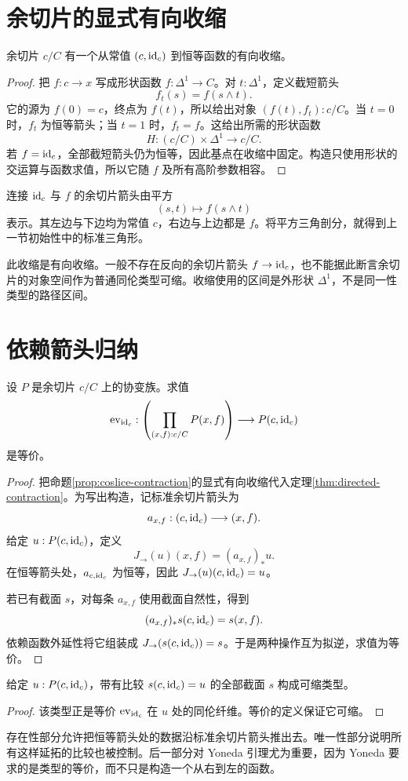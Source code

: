 \section{余切片的显式有向收缩}
\begin{proposition}[基于恒等箭头的收缩]\label{prop:coslice-contraction}
余切片 $c/C$ 有一个从常值 $(c,\operatorname{id}_c)$ 到恒等函数的有向收缩。
\end{proposition}
\begin{proof}
把 $f:c\to x$ 写成形状函数 $f:\Delta^1\to C$。对 $t:\Delta^1$，定义截短箭头
\[
f_t(s)=f(s\wedge t).
\]
它的源为 $f(0)=c$，终点为 $f(t)$，所以给出对象 $(f(t),f_t):c/C$。当 $t=0$ 时，$f_t$ 为恒等箭头；当 $t=1$ 时，$f_t=f$。这给出所需的形状函数
\[
H:(c/C)\times\Delta^1\longrightarrow c/C.
\]
若 $f=\operatorname{id}_c$，全部截短箭头仍为恒等，因此基点在收缩中固定。构造只使用形状的交运算与函数求值，所以它随 $f$ 及所有高阶参数相容。
\end{proof}
\begin{example}[收缩的平方]
连接 $\operatorname{id}_c$ 与 $f$ 的余切片箭头由平方
\[
(s,t)\longmapsto f(s\wedge t)
\]
表示。其左边与下边均为常值 $c$，右边与上边都是 $f$。将平方三角剖分，就得到上一节初始性中的标准三角形。
\end{example}
\begin{remark}
此收缩是有向收缩。一般不存在反向的余切片箭头 $f\to\operatorname{id}_c$，也不能据此断言余切片的对象空间作为普通同伦类型可缩。收缩使用的区间是外形状 $\Delta^1$，不是同一性类型的路径区间。
\end{remark}

\section{依赖箭头归纳}
\begin{theorem}[箭头归纳]\label{thm:arrow-induction}
设 $P$ 是余切片 $c/C$ 上的协变族。求值
\[
\operatorname{ev}_{\operatorname{id}_c}:
\left(\prod_{(x,f):c/C}P(x,f)\right)
\longrightarrow P(c,\operatorname{id}_c)
\]
是等价。
\end{theorem}
\begin{proof}
把命题\ref{prop:coslice-contraction}的显式有向收缩代入定理\ref{thm:directed-contraction}。为写出构造，记标准余切片箭头为
\[
a_{x,f}:(c,\operatorname{id}_c)\longrightarrow(x,f).
\]
给定 $u:P(c,\operatorname{id}_c)$，定义
\[
J_{\to}(u)(x,f)=(a_{x,f})_*u.
\]
在恒等箭头处，$a_{c,\operatorname{id}_c}$ 为恒等，因此
$J_{\to}(u)(c,\operatorname{id}_c)=u$。

若已有截面 $s$，对每条 $a_{x,f}$ 使用截面自然性，得到
\[
(a_{x,f})_*s(c,\operatorname{id}_c)=s(x,f).
\]
依赖函数外延性将它组装成 $J_{\to}(s(c,\operatorname{id}_c))=s$。于是两种操作互为拟逆，求值为等价。
\end{proof}
\begin{proposition}[箭头归纳的唯一性]
给定 $u:P(c,\operatorname{id}_c)$，带有比较 $s(c,\operatorname{id}_c)=u$ 的全部截面 $s$ 构成可缩类型。
\end{proposition}
\begin{proof}
该类型正是等价 $\operatorname{ev}_{\operatorname{id}_c}$ 在 $u$ 处的同伦纤维。等价的定义保证它可缩。
\end{proof}
\begin{remark}
存在性部分允许把恒等箭头处的数据沿标准余切片箭头推出去。唯一性部分说明所有这样延拓的比较也被控制。后一部分对 Yoneda 引理尤为重要，因为 Yoneda 要求的是类型的等价，而不只是构造一个从右到左的函数。
\end{remark}


